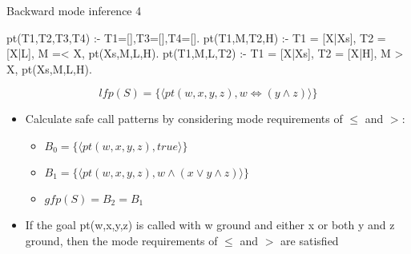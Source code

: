 \documentclass{beamer}
\begin{document}
\begin{frame}[fragile]{Backward mode inference 4}
\vspace{\fill}

\begin{minipage}[t]{.35\textwidth}
\begin{semiverbatim}
pt(T1,T2,T3,T4) :-
     T1=[],T3=[],T4=[].
pt(T1,M,T2,H) :-
     T1 = [X|Xs],
     T2 = [X|L],
     M =< X,
     pt(Xs,M,L,H).
pt(T1,M,L,T2) :-
     T1 = [X|Xs],
     T2 = [X|H],
     M > X,
     pt(Xs,M,L,H).
\end{semiverbatim}

\[ lfp(S)=
\{\langle pt(w,x,y,z), w\Leftrightarrow(y\wedge z)\rangle\}\]
\end{minipage} \hspace{\fill}
\begin{minipage}[t]{.55\textwidth}
\begin{itemize}
    \item Calculate safe call patterns by considering  mode requirements of $\leq$ and $>$:
    \begin{itemize} \small
        \item \(B_0 = \{\langle pt(w,x,y,z), true\rangle\}\)
        \item \(B_1 = \{\langle pt(w,x,y,z), w\wedge(x\vee y\wedge z)\rangle\} \)
        \item \(gfp(S) = B_2 = B_1\)
    \end{itemize}

    \item If the goal pt(w,x,y,z) is called with w ground and either x or both y
        and z ground, then the mode requirements of $\leq$ and $>$ are satisfied

\end{itemize}

\end{minipage}



\vspace{\fill}

\end{frame}
\end{document}
